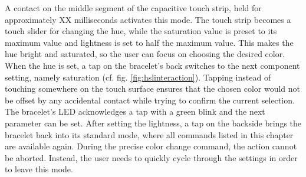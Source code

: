 %	
%		

A contact on the middle segment of the capacitive touch strip, held for approximately XX milliseconds activates this mode. The touch strip becomes a touch slider for changing the hue, while the saturation value is preset to its maximum value and lightness is set to half the maximum value. This makes the hue bright and saturated, so the user can focus on choosing the desired color. When the hue is set, a tap on the bracelet's back switches to the next component setting, namely saturation (cf. fig. \ref{fig:hslinteraction}). Tapping instead of touching somewhere on the touch surface ensures that the chosen color would not be offset by any accidental contact while trying to confirm the current selection. The bracelet's \ac{LED} acknowledges a tap with a green blink and the next parameter can be set. After setting the lightness, a tap on the backside brings the bracelet back into its standard mode, where all commands listed in this chapter are available again. During the precise color change command, the action cannot be aborted. Instead, the user needs to quickly cycle through the settings in order to leave this mode.

